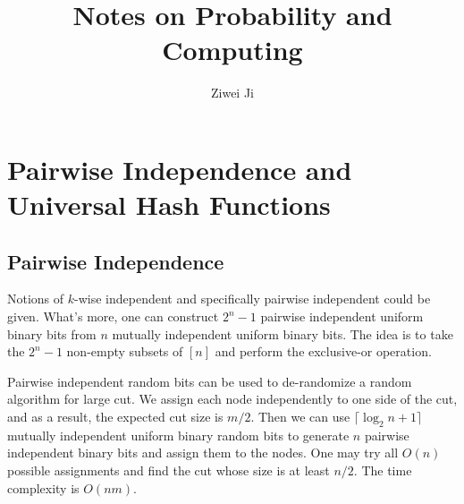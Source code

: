 \documentclass[openany]{book}
\author{Ziwei Ji}
\title{Notes on Probability and Computing}
\begin{document}
\newcommand{\tbf}[1]{\textbf{#1}}
\newcommand{\bs}[1]{\boldsymbol{#1}}
\newcommand{\mr}[1]{\mathrm{#1}}
\newcommand{\mc}[1]{\mathcal{#1}}
\newcommand{\mbb}[1]{\mathbb{#1}}
\newcommand{\mbf}[1]{\mathbf{#1}}

\maketitle

\setcounter{chapter}{12}

\chapter{Pairwise Independence and Universal Hash Functions}
\section{Pairwise Independence}
Notions of $k$-wise independent and specifically pairwise independent could be given. What's more, one can construct $2^n-1$ pairwise independent uniform binary bits from $n$ mutually independent uniform binary bits. The idea is to take the $2^n-1$ non-empty subsets of $[n]$ and perform the exclusive-or operation.

Pairwise independent random bits can be used to de-randomize a random algorithm for large cut. We assign each node independently to one side of the cut, and as a result, the expected cut size is $m/2$. Then we can use $\lceil\log_2{n+1}\rceil$ mutually independent uniform binary random bits to generate $n$ pairwise independent binary bits and assign them to the nodes. One may try all $O(n)$ possible assignments and find the cut whose size is at least $n/2$. The time complexity is $O(nm)$.
\end{document}
